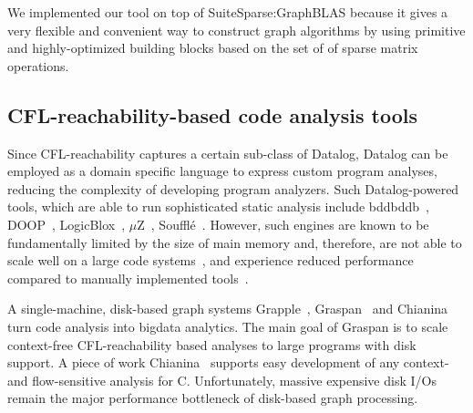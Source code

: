 We implemented our tool on top of SuiteSparse:GraphBLAS because it gives a very flexible and convenient way to construct graph algorithms by using primitive and highly-optimized building blocks based on the set of of sparse matrix operations.
\subsection{CFL-reachability-based code analysis tools}
Since CFL-reachability captures a certain sub-class of Datalog, Datalog can be employed as a domain specific language to express custom program analyses, reducing the complexity of developing program analyzers. Such Datalog-powered tools, which are able to run sophisticated static analysis include bddbddb~\cite{10.1007/11575467_8}, DOOP~\cite{10.1145/1640089.1640108}, LogicBlox~\cite{10.1145/2723372.2742796}, $\mu$Z~\cite{10.1007/978-3-642-22110-1_36}, Souffl{\'e}~\cite{10.1007/978-3-319-41540-6_23}. However, such engines are known to be fundamentally limited by the size of main memory and, therefore, are not able to scale well on a large code systems~\cite{10.1145/3453483.3454085}, and experience reduced performance compared to manually implemented tools~\cite{10.1007/978-3-319-41540-6_23}.

A single-machine, disk-based graph systems Grapple~\cite{10.1145/3302424.3303972}, Graspan~\cite{10.1145/3037697.3037744} and Chianina~\cite{10.1145/3453483.3454085} turn code analysis into bigdata analytics. The main goal of Graspan is to scale context-free CFL-reachability based analyses to large programs with disk support. A piece of work Chianina~\cite{10.1145/3453483.3454085} supports easy development of any context- and flow-sensitive analysis for C. Unfortunately, massive expensive disk I/Os remain the major performance bottleneck of disk-based graph processing.

